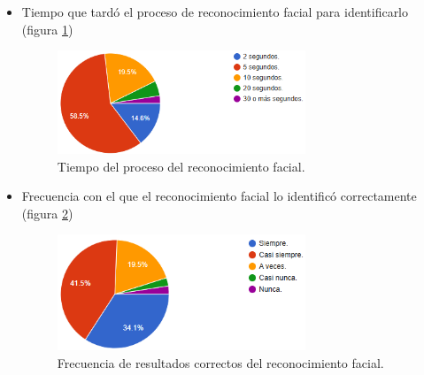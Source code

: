 \begin{itemize}
	\item Tiempo que tardó el proceso de reconocimiento facial para identificarlo (figura \ref{fig:tiempo-RF})
	\begin{figure}[H]
		\centering
		\includegraphics[width=0.7\textwidth]{images/TRF.png}
		\caption{Tiempo del proceso del reconocimiento facial.}
		\label{fig:tiempo-RF}
	\end{figure}
	
	\item Frecuencia con el que el reconocimiento facial lo identificó correctamente (figura \ref{fig:FRF})
	\begin{figure}[H]
		\centering
		\includegraphics[width=0.7\textwidth]{images/FRF.png}
		\caption{Frecuencia de resultados correctos del reconocimiento facial.}
		\label{fig:FRF}
	\end{figure}
	\newpage
	

\end{itemize}
